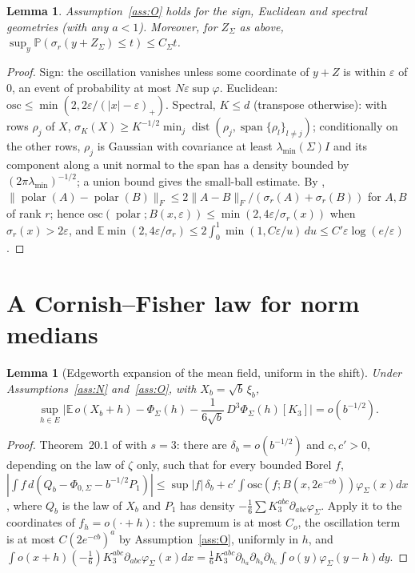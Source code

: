 \documentclass[10pt]{article}
\newtheorem{lemma}[theorem]{Lemma}
\theoremstyle{definition}
\theoremstyle{remark}
\newcommand{\E}{\mathbb{E}}
\newcommand{\Prob}{\mathbb{P}}
\newcommand{\nF}[1]{\|#1\|_{F}}
\newcommand{\polar}{\operatorname{polar}}
\begin{document}
\begin{lemma}\label{lem:osc}
Assumption~\ref{ass:O} holds for the sign, Euclidean and spectral geometries (with any $a<1$). Moreover, for
$Z_\Sigma$ as above, $\sup_y\Prob(\sigma_r(y+Z_\Sigma)\le t)\le C_\Sigma t$.
\end{lemma}
\begin{proof}
Sign: the oscillation vanishes unless some coordinate of $y+Z$ is within $\varepsilon$ of $0$, an event of probability at
most $N\varepsilon\sup\varphi$. Euclidean: $\mathrm{osc}\le\min(2,2\varepsilon/(|x|-\varepsilon)_+)$. Spectral, $K\le d$
(transpose otherwise): with rows $\rho_j$ of $X$, $\sigma_K(X)\ge K^{-1/2}\min_j\operatorname{dist}(\rho_j,\operatorname{span}\{\rho_l\}_{l\ne j})$;
conditionally on the other rows, $\rho_j$ is Gaussian with covariance at least $\lambda_{\min}(\Sigma)I$ and its
component along a unit normal to the span has a density bounded by $(2\pi\lambda_{\min})^{-1/2}$; a union bound gives the
small-ball estimate. By \cite{lisun}, $\nF{\polar(A)-\polar(B)}\le2\nF{A-B}/(\sigma_r(A)+\sigma_r(B))$ for $A,B$ of rank
$r$; hence $\mathrm{osc}(\polar;B(x,\varepsilon))\le\min(2,4\varepsilon/\sigma_r(x))$ when $\sigma_r(x)>2\varepsilon$, and
$\E\min(2,4\varepsilon/\sigma_r)\le2\int_0^1\min(1,C\varepsilon/u)\,du\le C'\varepsilon\log(e/\varepsilon)$.
\end{proof}

\section{A Cornish--Fisher law for norm medians}\label{sec:cf}

\begin{lemma}[Edgeworth expansion of the mean field, uniform in the shift]\label{lem:edge}
Under Assumptions~\ref{ass:N} and~\ref{ass:O}, with $X_b=\sqrt b\,\xi_b$,
\[
\sup_{h\in E}\Big|\E\,o(X_b+h)-\Phi_\Sigma(h)-\frac1{6\sqrt b}\,D^3\Phi_\Sigma(h)[K_3]\Big|=o(b^{-1/2}).
\]
\end{lemma}
\begin{proof}
Theorem~20.1 of \cite{br} with $s=3$: there are $\delta_b=o(b^{-1/2})$ and $c,c'>0$, depending on the law of $\zeta$
only, such that for every bounded Borel $f$,
$|\int f\,d(Q_b-\Phi_{0,\Sigma}-b^{-1/2}P_1)|\le\sup|f|\,\delta_b+c'\int\mathrm{osc}(f;B(x,2e^{-cb}))\varphi_\Sigma(x)dx$,
where $Q_b$ is the law of $X_b$ and $P_1$ has density $-\frac16\sum K_3^{abc}\partial_{abc}\varphi_\Sigma$. Apply it to
the coordinates of $f_h=o(\cdot+h)$: the supremum is at most $C_o$, the oscillation term is at most
$C(2e^{-cb})^a$ by Assumption~\ref{ass:O}, uniformly in $h$, and
$\int o(x+h)(-\tfrac16)K_3^{abc}\partial_{abc}\varphi_\Sigma(x)dx=\frac16K_3^{abc}\partial_{h_a}\partial_{h_b}\partial_{h_c}\int
o(y)\varphi_\Sigma(y-h)dy$.
\end{proof}
\end{document}
